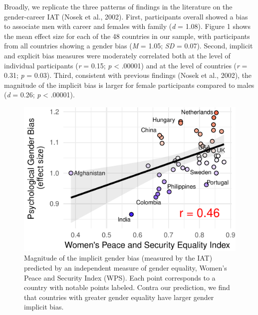 \documentclass[10pt, letterpaper]{article}
\newenvironment{CodeChunk}{}{}
\begin{document}
Broadly, we replicate the three patterns of findings in the literature
on the gender-career IAT (Nosek et al., 2002). First, participants
overall showed a bias to associate men with career and females with
family (\emph{d} = 1.08). Figure 1 shows the mean effect size for each
of the 48 countries in our sample, with participants from all countries
showing a gender bias (\emph{M} = 1.05; \emph{SD} = 0.07). Second,
implicit and explicit bias measures were moderately correlated both at
the level of individual participants (\emph{r} = 0.15; \emph{p}
\textless{} .00001) and at the level of countries (\emph{r} = 0.31;
\emph{p} = 0.03). Third, consistent with previous findings (Nosek et
al., 2002), the magnitude of the implicit bias is larger for female
participants compared to males (\emph{d} = 0.26; \emph{p} \textless{}
.00001).

\begin{CodeChunk}
\begin{figure}[t]

{\centering \includegraphics{figs/WPS_plot-1} 

}

\caption[Magnitude of the implicit gender bias (measured by the IAT) predicted by an independent measure of gender equality, Women's Peace and Security Index (WPS)]{Magnitude of the implicit gender bias (measured by the IAT) predicted by an independent measure of gender equality, Women's Peace and Security Index (WPS).  Each point corresponds to a country with notable points labeled. Contra our prediction, we find that countries with greater gender equality have larger gender implicit bias.}\label{fig:WPS_plot}
\end{figure}
\end{CodeChunk}
\end{document}
